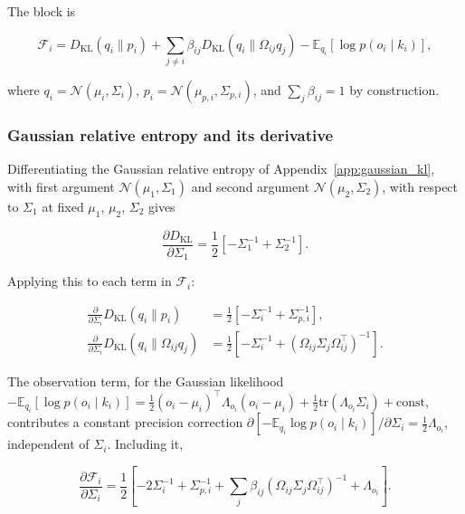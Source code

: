 The block is

\begin{equation}
\mathcal{F}_i
=D_{\mathrm{KL}}(q_i \| p_i)
+ \sum_{j \neq i} \beta_{ij}
D_{\mathrm{KL}}(q_i \| \Omega_{ij} q_j)
- \mathbb{E}_{q_i}[\log p(o_i \mid k_i)],
\end{equation}

where $q_i = \mathcal{N}(\mu_i, \Sigma_i)$, $p_i = \mathcal{N}(\mu_{p,i}, \Sigma_{p,i})$, and $\sum_j \beta_{ij} = 1$ by construction.

\subsubsection{Gaussian relative entropy and its derivative}

Differentiating the Gaussian relative entropy of Appendix~\ref{app:gaussian_kl}, with first argument $\mathcal{N}(\mu_1,\Sigma_1)$ and second argument $\mathcal{N}(\mu_2,\Sigma_2)$, with respect to $\Sigma_1$ at fixed $\mu_1$, $\mu_2$, $\Sigma_2$ gives

\begin{equation}
\frac{\partial D_{\mathrm{KL}}}{\partial \Sigma_1}
=\frac{1}{2}\left[
-\Sigma_1^{-1}
+ \Sigma_2^{-1}
\right].
\end{equation}

Applying this to each term in $\mathcal{F}_i$:

\begin{align}
\frac{\partial}{\partial \Sigma_i}
D_{\mathrm{KL}}(q_i \| p_i)
&=\frac{1}{2}\left[
-\Sigma_i^{-1}
+ \Sigma_{p,i}^{-1}
\right],
\\[6pt]
\frac{\partial}{\partial \Sigma_i}
D_{\mathrm{KL}}(q_i \| \Omega_{ij} q_j)
&=
\frac{1}{2}\left[
-\Sigma_i^{-1}
+ (\Omega_{ij}\Sigma_j\Omega_{ij}^\top)^{-1}
\right].
\end{align}

The observation term, for the Gaussian likelihood $-\mathbb{E}_{q_i}[\log p(o_i \mid k_i)] = \tfrac{1}{2}(o_i - \mu_i)^\top \Lambda_{o_i}(o_i - \mu_i) + \tfrac{1}{2}\mathrm{tr}(\Lambda_{o_i}\Sigma_i) + \mathrm{const}$, contributes a constant precision correction $\partial[-\mathbb{E}_{q_i}\log p(o_i \mid k_i)]/\partial\Sigma_i = \tfrac{1}{2}\Lambda_{o_i}$, independent of $\Sigma_i$. Including it,

\begin{equation}
\boxed{
\frac{\partial \mathcal{F}_i}{\partial \Sigma_i}
=\frac{1}{2}
\left[
-2 \Sigma_i^{-1}
+ \Sigma_{p,i}^{-1}
+ \sum_j \beta_{ij}
(\Omega_{ij}\Sigma_j\Omega_{ij}^\top)^{-1}
+ \Lambda_{o_i}
\right].
}
\end{equation}

